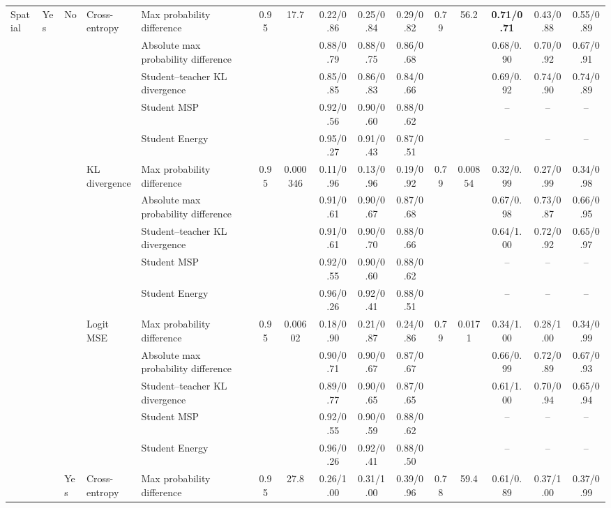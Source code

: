 \documentclass[border=2pt]{standalone}
\begin{document}
\begin{tabular}{lllllcccccccccc}
Spatial & Yes & No & Cross-entropy & Max probability difference & 0.95 & 17.7 & 0.22/0.86 & 0.25/0.84 & 0.29/0.82 & 0.79 & 56.2 & \textbf{0.71/0.71} & 0.43/0.88 & 0.55/0.89 \\
 &  &  &  & Absolute max probability difference &  &  & 0.88/0.79 & 0.88/0.75 & 0.86/0.68 &  &  & 0.68/0.90 & 0.70/0.92 & 0.67/0.91 \\
 &  &  &  & Student--teacher KL divergence &  &  & 0.85/0.85 & 0.86/0.83 & 0.84/0.66 &  &  & 0.69/0.92 & 0.74/0.90 & 0.74/0.89 \\
 &  &  &  & Student MSP &  &  & 0.92/0.56 & 0.90/0.60 & 0.88/0.62 &  &  & -- & -- & -- \\
 &  &  &  & Student Energy &  &  & 0.95/0.27 & 0.91/0.43 & 0.87/0.51 &  &  & -- & -- & -- \\
 &  &  & KL divergence & Max probability difference & 0.95 & 0.000346 & 0.11/0.96 & 0.13/0.96 & 0.19/0.92 & 0.79 & 0.00854 & 0.32/0.99 & 0.27/0.99 & 0.34/0.98 \\
 &  &  &  & Absolute max probability difference &  &  & 0.91/0.61 & 0.90/0.67 & 0.87/0.68 &  &  & 0.67/0.98 & 0.73/0.87 & 0.66/0.95 \\
 &  &  &  & Student--teacher KL divergence &  &  & 0.91/0.61 & 0.90/0.70 & 0.88/0.66 &  &  & 0.64/1.00 & 0.72/0.92 & 0.65/0.97 \\
 &  &  &  & Student MSP &  &  & 0.92/0.55 & 0.90/0.60 & 0.88/0.62 &  &  & -- & -- & -- \\
 &  &  &  & Student Energy &  &  & 0.96/0.26 & 0.92/0.41 & 0.88/0.51 &  &  & -- & -- & -- \\
 &  &  & Logit MSE & Max probability difference & 0.95 & 0.00602 & 0.18/0.90 & 0.21/0.87 & 0.24/0.86 & 0.79 & 0.0171 & 0.34/1.00 & 0.28/1.00 & 0.34/0.99 \\
 &  &  &  & Absolute max probability difference &  &  & 0.90/0.71 & 0.90/0.67 & 0.87/0.67 &  &  & 0.66/0.99 & 0.72/0.89 & 0.67/0.93 \\
 &  &  &  & Student--teacher KL divergence &  &  & 0.89/0.77 & 0.90/0.65 & 0.87/0.65 &  &  & 0.61/1.00 & 0.70/0.94 & 0.65/0.94 \\
 &  &  &  & Student MSP &  &  & 0.92/0.55 & 0.90/0.59 & 0.88/0.62 &  &  & -- & -- & -- \\
 &  &  &  & Student Energy &  &  & 0.96/0.26 & 0.92/0.41 & 0.88/0.50 &  &  & -- & -- & -- \\
 &  & Yes & Cross-entropy & Max probability difference & 0.95 & 27.8 & 0.26/1.00 & 0.31/1.00 & 0.39/0.96 & 0.78 & 59.4 & 0.61/0.89 & 0.37/1.00 & 0.37/0.99 \\

\end{tabular}
\end{document}
